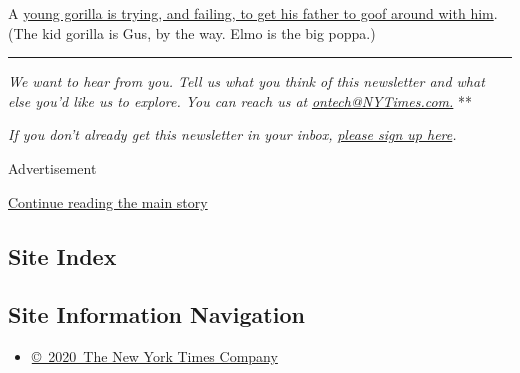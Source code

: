 A
\href{https://www.facebookcorewwwi.onion/FortWorthZoo/videos/422445615335977/}{young
gorilla is trying, and failing, to get his father to goof around with
him}. (The kid gorilla is Gus, by the way. Elmo is the big poppa.)

\begin{center}\rule{0.5\linewidth}{\linethickness}\end{center}

\emph{We want to hear from you. Tell us what you think of this
newsletter and what else you'd like us to explore. You can reach us at}
\href{mailto:ontech@NYTimes.com?subject=On\%20Tech\%20Feedback}{\emph{ontech@NYTimes.com.}}
**

\emph{If you don't already get this newsletter in your inbox,}
\href{https://www.nytimes3xbfgragh.onion/newsletters/signup/OT}{\emph{please
sign up here}}\emph{.}

Advertisement

\protect\hyperlink{after-bottom}{Continue reading the main story}

\hypertarget{site-index}{%
\subsection{Site Index}\label{site-index}}

\hypertarget{site-information-navigation}{%
\subsection{Site Information
Navigation}\label{site-information-navigation}}

\begin{itemize}
\tightlist
\item
  \href{https://help.nytimes3xbfgragh.onion/hc/en-us/articles/115014792127-Copyright-notice}{©~2020~The
  New York Times Company}
\end{itemize}

